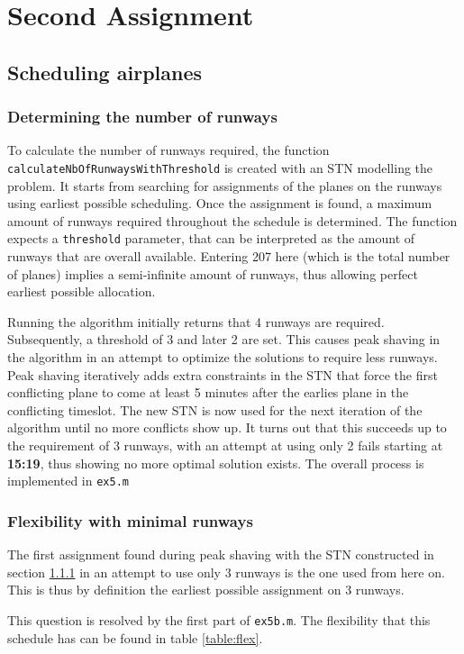 \documentclass[10pt,a4paper]{article}
\begin{document}
\section{Second Assignment}
\subsection{Scheduling airplanes}
\subsubsection{Determining the number of runways}
\label{sec:nb_of_runways}
To calculate the number of runways required, the function  \texttt{calculate\-Nb\-Of\-Run\-ways\-With\-Thres\-hold} is created with an STN modelling the problem. It starts from searching for assignments of the planes on the runways using earliest possible scheduling. Once the assignment is found, a maximum amount of runways required throughout the schedule is determined. The function expects a \texttt{threshold} parameter, that can be interpreted as the amount of runways that are overall available. Entering 207 here (which is the total number of planes) implies a semi-infinite amount of runways, thus allowing perfect earliest possible allocation.

Running the algorithm initially returns that 4 runways are required. Subsequently, a threshold of 3 and later 2 are set. This causes peak shaving in the algorithm in an attempt to optimize the solutions to require less runways. Peak shaving iteratively adds extra constraints in the STN that force the first conflicting plane to come at least 5 minutes after the earlies plane in the conflicting timeslot. The new STN is now used for the next iteration of the algorithm until no more conflicts show up. It turns out that this succeeds up to the requirement of 3 runways, with an attempt at using only 2 fails starting at \textbf{15:19}, thus showing no more optimal solution exists. The overall process is implemented in \texttt{ex5.m}

\subsubsection{Flexibility with minimal runways}
The first assignment found during peak shaving with the STN constructed in section \ref{sec:nb_of_runways} in an attempt to use only 3 runways is the one used from here on. This is thus by definition the earliest possible assignment on 3 runways.

This question is resolved by the first part of \texttt{ex5b.m}. The flexibility that this schedule has can be found in table \ref{table:flex}. 
\end{document}
